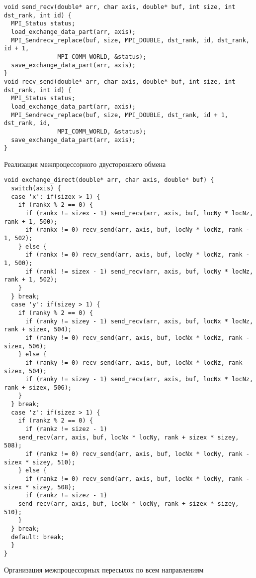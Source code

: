 \begin{listing}
\begin{verbatim}
void send_recv(double* arr, char axis, double* buf, int size, int dst_rank, int id) {
  MPI_Status status;
  load_exchange_data_part(arr, axis);
  MPI_Sendrecv_replace(buf, size, MPI_DOUBLE, dst_rank, id, dst_rank, id + 1,
		       MPI_COMM_WORLD, &status);
  save_exchange_data_part(arr, axis);
}
void recv_send(double* arr, char axis, double* buf, int size, int dst_rank, int id) {
  MPI_Status status;
  load_exchange_data_part(arr, axis);
  MPI_Sendrecv_replace(buf, size, MPI_DOUBLE, dst_rank, id + 1, dst_rank, id,
		       MPI_COMM_WORLD, &status);
  save_exchange_data_part(arr, axis);
}
\end{verbatim}
\caption{Реализация межпроцессорного двустороннего обмена}
\label{lst_exchange}
\end{listing}
\begin{listing}
\begin{verbatim}
void exchange_direct(double* arr, char axis, double* buf) {
  switch(axis) {
  case 'x': if(sizex > 1) {
    if (rankx % 2 == 0) {
      if (rankx != sizex - 1) send_recv(arr, axis, buf, locNy * locNz, rank + 1, 500);
      if (rankx != 0) recv_send(arr, axis, buf, locNy * locNz, rank - 1, 502);
    } else {
      if (rankx != 0) recv_send(arr, axis, buf, locNy * locNz, rank - 1, 500);
      if (rank) != sizex - 1) send_recv(arr, axis, buf, locNy * locNz, rank + 1, 502);
    }
  } break;
  case 'y': if(sizey > 1) {
    if (ranky % 2 == 0) {
      if (ranky != sizey - 1) send_recv(arr, axis, buf, locNx * locNz, rank + sizex, 504);
      if (ranky != 0) recv_send(arr, axis, buf, locNx * locNz, rank - sizex, 506);
    } else {
      if (ranky != 0) recv_send(arr, axis, buf, locNx * locNz, rank - sizex, 504);
      if (ranky != sizey - 1) send_recv(arr, axis, buf, locNx * locNz, rank + sizex, 506);
    }
  } break;
  case 'z': if(sizez > 1) {
    if (rankz % 2 == 0) {
      if (rankz != sizez - 1)
	send_recv(arr, axis, buf, locNx * locNy, rank + sizex * sizey, 508);
      if (rankz != 0) recv_send(arr, axis, buf, locNx * locNy, rank - sizex * sizey, 510);
    } else {
      if (rankz != 0) recv_send(arr, axis, buf, locNx * locNy, rank - sizex * sizey, 508);
      if (rankz != sizez - 1)
	send_recv(arr, axis, buf, locNx * locNy, rank + sizex * sizey, 510);
    }
  } break;
  default: break;
  }
}
\end{verbatim}
\caption{Организация межпроцессорных пересылок по всем направлениям}
\label{lst_exchanges}
\end{listing}

